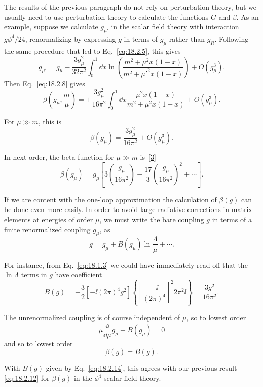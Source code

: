 The results of the previous paragraph do not rely on perturbation theory, but
we usually need to use perturbation theory to calculate the functions $G$ and
$\beta$. As an example, suppose we calculate $g_{\mu'}$ in the scalar field
theory with interaction $g\phi^4/24$, renormalizing by expressing $g$ in terms
of $g_\mu$ rather than $g_R$. Following the same procedure that led to
Eq.~\eqref{eq:18.2.5}, this gives
\[
g_{\mu'}=g_\mu-\frac{3g_\mu^2}{32\pi^2}\int_0^1\dd x
\ln\left(\frac{m^2+\mu^2x(1-x)}{m^2+\mu'^2x(1-x)}\right)
+O(g_\mu^3).
\]
Then Eq.~\eqref{eq:18.2.8} gives
\begin{equation}
\beta\left(g_\mu,\frac{m}{\mu}\right)
=+\frac{3g_\mu^2}{16\pi^2}\int_0^1\dd x
\frac{\mu^2x(1-x)}{m^2+\mu^2x(1-x)}+O(g_\mu^3).
\tag{18.2.11}\label{eq:18.2.11}
\end{equation}
\par\noindent
For $\mu\gg m$, this is
\begin{equation}
\beta(g_\mu)=\frac{3g_\mu^2}{16\pi^2}+O(g_\mu^3).
\tag{18.2.12}\label{eq:18.2.12}
\end{equation}
\par\noindent
In next order, the beta-function for $\mu\gg m$ is~\hyperref[ch18-ref-3]{[3]}
\[
\beta(g_\mu)=g_\mu\left[3\left(\frac{g_\mu}{16\pi^2}\right)
-\frac{17}{3}\left(\frac{g_\mu}{16\pi^2}\right)^2+\cdots\right].
\]

If we are content with the one-loop approximation the calculation of
$\beta(g)$ can be done even more easily. In order to avoid large radiative
corrections in matrix elements at energies of order $\mu$, we must write the
bare coupling $g$ in terms of a finite renormalized coupling $g_\mu$, as
\begin{equation}
g=g_\mu+B(g_\mu)\ln\frac{\Lambda}{\mu}+\cdots.
\tag{18.2.13}\label{eq:18.2.13}
\end{equation}
\par\noindent
For instance, from Eq.~\eqref{eq:18.1.3} we could have immediately read off
that the $\ln\Lambda$ terms in $g$ have coefficient
\begin{equation}
B(g)=-\frac{3}{2}\left[-\ii(2\pi)^4g^2\right]
\left\{\left[\frac{-\ii}{(2\pi)^4}\right]^2 2\pi^2\ii\right\}
=\frac{3g^2}{16\pi^2}.
\tag{18.2.14}\label{eq:18.2.14}
\end{equation}
\par\noindent
The unrenormalized coupling is of course independent of $\mu$, so to lowest
order
\[
\mu\frac{\dd}{\dd\mu}g_\mu-B(g_\mu)=0
\]
and so to lowest order
\begin{equation}
\beta(g)=B(g).
\tag{18.2.15}\label{eq:18.2.15}
\end{equation}
\par\noindent
With $B(g)$ given by Eq.~\eqref{eq:18.2.14}, this agrees with our previous
result \eqref{eq:18.2.12} for $\beta(g)$ in the $\phi^4$ scalar field theory.

